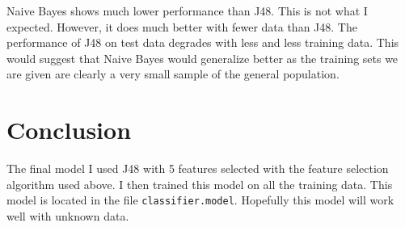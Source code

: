 \documentclass[10pt]{article}
\begin{document}
Naive Bayes shows much lower performance than J48.  This is not what I 
expected.  However, it does much better with fewer data than J48.  The 
performance of J48 on test data degrades with less and less training data.  
This would suggest that Naive Bayes would generalize better as the training 
sets we are given are clearly a very small sample of the general population.

\section{Conclusion}
The final model I used J48 with 5 features selected with the feature 
selection algorithm used above.  I then trained this model on all the 
training data.  This model is located in the file {\tt classifier.model}.  Hopefully
this model will work well with unknown data.
\end{document}
